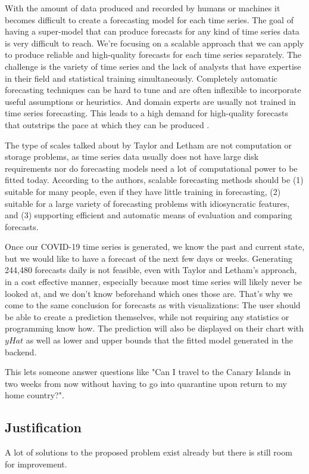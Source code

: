 With the amount of data produced and recorded by humans or machines it becomes difficult to create a forecasting model for each time series. The goal of having a super-model that can produce forecasts for any kind of time series data is very difficult to reach. We're focusing on a scalable approach that we can apply to produce reliable and high-quality forecasts for each time series separately. The challenge is the variety of time series and the lack of analysts that have expertise in their field and statistical training simultaneously. Completely automatic forecasting techniques can be hard to tune and are often inflexible to incorporate useful assumptions or heuristics. And domain experts are usually not trained in time series forecasting. This leads to a high demand for high-quality forecasts that outstrips the pace at which they can be produced \cite{b1}.

The type of scales talked about by Taylor and Letham are not computation or storage problems, as time series data usually does not have large disk requirements nor do forecasting models need a lot of computational power to be fitted today. According to the authors, scalable forecasting methods should be (1) suitable for many people, even if they have little training in forecasting, (2) suitable for a large variety of forecasting problems with idiosyncratic features, and (3) supporting efficient and automatic means of evaluation and comparing forecasts.

Once our COVID-19 time series is generated, we know the past and current state, but we would like to have a forecast of the next few days or weeks. Generating 244,480 forecasts daily is not feasible, even with Taylor and Letham's approach, in a cost effective manner, especially because most time series will likely never be looked at, and we don't know beforehand which ones those are. That's why we come to the same conclusion for forecasts as with visualizations: The user should be able to create a prediction themselves, while not requiring any statistics or programming know how. The prediction will also be displayed on their chart with \(yHat\) as well as lower and upper bounds that the fitted model generated in the backend.

This lets someone answer questions like "Can I travel to the Canary Islands in two weeks from now without having to go into quarantine upon return to my home country?".

\subsection{Justification}
A lot of solutions to the proposed problem exist already but there is still room for improvement.

